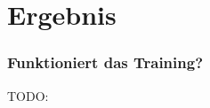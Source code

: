 \section{Ergebnis}

\begin{frame}
    \frametitle{Funktioniert das Training?}

    TODO:

\end{frame}
